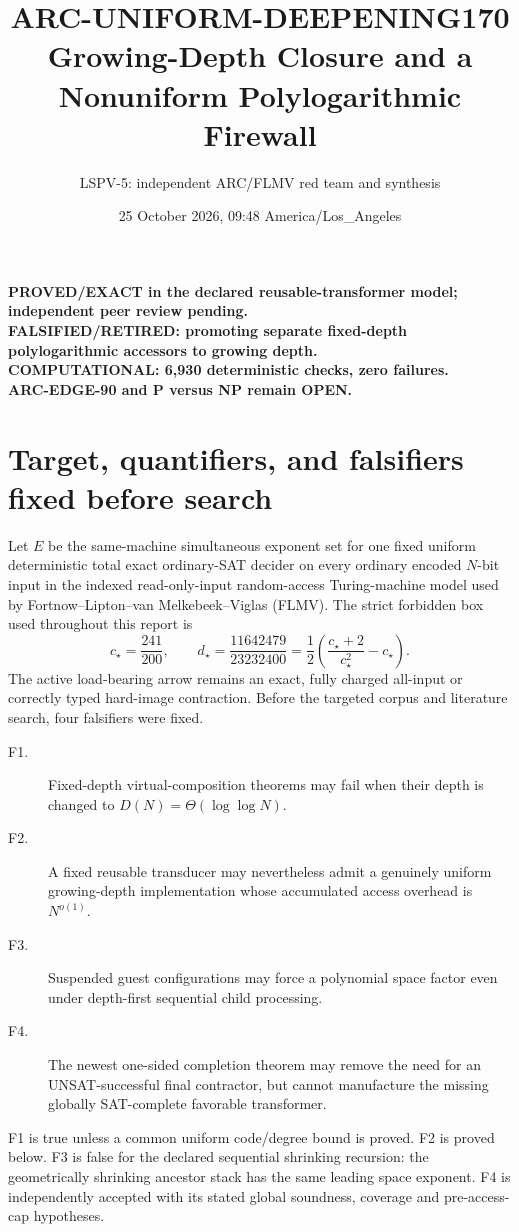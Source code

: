 \documentclass[11pt]{article}
\title{ARC-UNIFORM-DEEPENING170\\
\large Growing-Depth Closure and a Nonuniform Polylogarithmic Firewall}
\author{LSPV-5: independent ARC/FLMV red team and synthesis}
\date{25 October 2026, 09:48 America/Los\_Angeles}
\begin{document}
\maketitle
\begin{center}
\textbf{PROVED/EXACT in the declared reusable-transformer model; independent peer review pending.}\\
\textbf{FALSIFIED/RETIRED: promoting separate fixed-depth polylogarithmic accessors to growing depth.}\\
\textbf{COMPUTATIONAL: 6,930 deterministic checks, zero failures.}\\
\textbf{ARC-EDGE-90 and P versus NP remain OPEN.}
\end{center}

\section{Target, quantifiers, and falsifiers fixed before search}
Let $E$ be the same-machine simultaneous exponent set for one fixed uniform
deterministic total exact ordinary-SAT decider on every ordinary encoded
$N$-bit input in the indexed read-only-input random-access Turing-machine
model used by Fortnow--Lipton--van Melkebeek--Viglas (FLMV).  The strict
forbidden box used throughout this report is
\[
 c_\star=\frac{241}{200},\qquad
 d_\star=\frac{11642479}{23232400}
 =\frac12\left(\frac{c_\star+2}{c_\star^2}-c_\star\right).
\]
The active load-bearing arrow remains an exact, fully charged all-input or
correctly typed hard-image contraction.  Before the targeted corpus and
literature search, four falsifiers were fixed.
\begin{description}
\item[F1.] Fixed-depth virtual-composition theorems may fail when their depth
is changed to $D(N)=\Theta(\log\log N)$.
\item[F2.] A fixed reusable transducer may nevertheless admit a genuinely
uniform growing-depth implementation whose accumulated access overhead is
$N^{o(1)}$.
\item[F3.] Suspended guest configurations may force a polynomial space factor
even under depth-first sequential child processing.
\item[F4.] The newest one-sided completion theorem may remove the need for an
UNSAT-successful final contractor, but cannot manufacture the missing
globally SAT-complete favorable transformer.
\end{description}
F1 is true unless a common uniform code/degree bound is proved.  F2 is proved
below.  F3 is false for the declared sequential shrinking recursion: the
geometrically shrinking ancestor stack has the same leading space exponent.
F4 is independently accepted with its stated global soundness, coverage and
pre-access-cap hypotheses.
\end{document}
